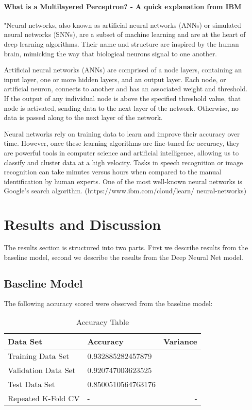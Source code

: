 \documentclass[fleqn,10pt]{SelfArx} %
\begin{document}
\paragraph{What is a Multilayered Perceptron? - A quick explanation from IBM} "Neural networks, also known as artificial neural networks (ANNs) or simulated neural networks (SNNs), are a subset of machine learning and are at the heart of deep learning algorithms. Their name and structure are inspired by the human brain, mimicking the way that biological neurons signal to one another.

Artificial neural networks (ANNs) are comprised of a node layers, containing an input layer, one or more hidden layers, and an output layer. Each node, or artificial neuron, connects to another and has an associated weight and threshold. If the output of any individual node is above the specified threshold value, that node is activated, sending data to the next layer of the network. Otherwise, no data is passed along to the next layer of the network.

Neural networks rely on training data to learn and improve their accuracy over time. However, once these learning algorithms are fine-tuned for accuracy, they are powerful tools in computer science and artificial intelligence, allowing us to classify and cluster data at a high velocity. Tasks in speech recognition or image recognition can take minutes versus hours when compared to the manual identification by human experts. One of the most well-known neural networks is Google’s search algorithm. (https://www.ibm.com/cloud/learn/ \newline neural-networks)

\section{Results and Discussion}
The results section is structured into two parts. First we describe results from the baseline model, second we describe the results from the Deep Neural Net model.

\subsection{Baseline Model}
The following accuracy scored were observed from the baseline model:

\begin{table}[hbt]
	\caption{Accuracy Table}
	\centering
	\begin{tabular}{llr}
		\toprule
		 Data Set & Accuracy & Variance\\
		\midrule
		Training Data Set & 0.932885282457879\\
		Validation Data Set & 0.920747003623525 \\
		Test Data Set & 0.8500510564763176 \\
		Repeated K-Fold CV & - & - \\
		\bottomrule
	\end{tabular}
	\label{tab:label}
\end{table}
\end{document}
